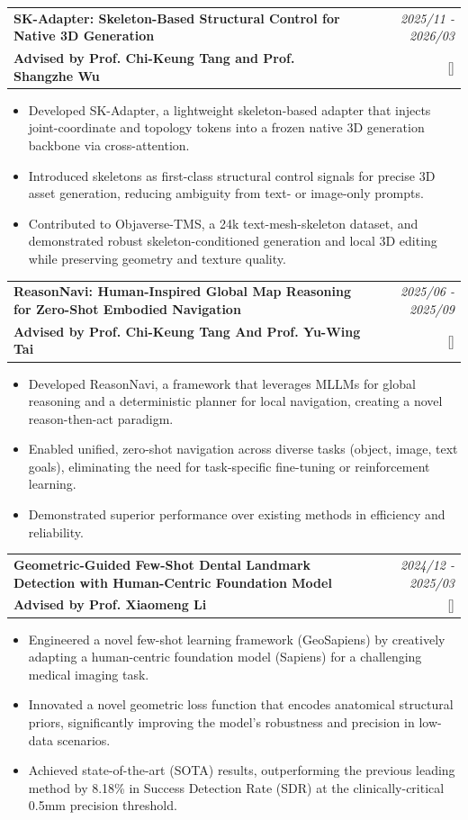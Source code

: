 \documentclass[a4paper,11pt]{article}
\makeatletter
\newcommand{\resumeProject}[4]{
\vspace{0.5mm}\item
    \begin{tabular*}{0.98\textwidth}[t]{l@{\extracolsep{\fill}}r}
        \textbf{#1} & \textit{\footnotesize{#3}} \\
        \footnotesize{#2} & \footnotesize{#4}
    \end{tabular*}
    \vspace{-2.4mm}
}
\newcommand{\resumeItemListStart}{\begin{itemize}[leftmargin=*,labelsep=1mm,itemsep=0.5mm]}
\newcommand{\resumeItemListEnd}{\end{itemize}\vspace{-2mm}}
\makeatother
\begin{document}
\resumeProject
{SK-Adapter: Skeleton-Based Structural Control for Native 3D Generation}
{\textbf{Advised by Prof. Chi-Keung Tang and Prof. Shangzhe Wu}}
{2025/11 - 2026/03}
{{}[\href{https://sk-adapter.github.io/}{\textcolor{darkblue}{\faGlobe}}]}

\resumeItemListStart
\item Developed SK-Adapter, a lightweight skeleton-based adapter that injects joint-coordinate and topology tokens into a frozen native 3D generation backbone via cross-attention.
\item 
Introduced skeletons as first-class structural control signals for precise 3D asset generation, reducing ambiguity from text- or image-only prompts.
\item 
Contributed to Objaverse-TMS, a 24k text-mesh-skeleton dataset, and demonstrated robust skeleton-conditioned generation and local 3D editing while preserving geometry and texture quality.
\resumeItemListEnd

\resumeProject
{ReasonNavi: Human-Inspired Global Map Reasoning for Zero-Shot Embodied Navigation}
{\textbf{Advised by Prof. Chi-Keung Tang And Prof. Yu-Wing Tai}}
{2025/06 - 2025/09}
{{}[\href{https://reasonnavi.github.io/}{\textcolor{darkblue}{\faGlobe}}]}
  
\resumeItemListStart
\item Developed ReasonNavi, a framework that leverages MLLMs for global reasoning and a deterministic planner for local navigation, creating a novel reason-then-act paradigm.
\item 
Enabled unified, zero-shot navigation across diverse tasks (object, image, text goals), eliminating the need for task-specific fine-tuning or reinforcement learning.
\item 
Demonstrated superior performance over existing methods in efficiency and reliability.
\resumeItemListEnd

\resumeProject
  {Geometric-Guided Few-Shot Dental Landmark Detection with Human-Centric Foundation Model }
  {\textbf{Advised by Prof. Xiaomeng Li}}
  {2024/12 - 2025/03}
  {{}[\href{https://github.com/xmed-lab/GeoSapiens}{\textcolor{darkblue}{\faGithub}}]}
\resumeItemListStart
  \item
  Engineered a novel few-shot learning framework (GeoSapiens) by creatively adapting a human-centric foundation model (Sapiens) for a challenging medical imaging task.
  \item 
Innovated a novel geometric loss function that encodes anatomical structural priors, significantly improving the model's robustness and precision in low-data scenarios.
\item 
Achieved state-of-the-art (SOTA) results, outperforming the previous leading method by 8.18\% in Success Detection Rate (SDR) at the clinically-critical 0.5mm precision threshold.
\resumeItemListEnd
\end{document}
